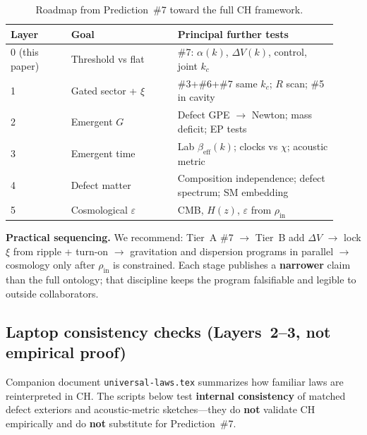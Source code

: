\documentclass[11pt,a4paper]{article}
\begin{document}
\begin{table}[htbp]
  \centering
  \small
  \caption{Roadmap from Prediction~\#7 toward the full CH framework.}
  \label{tab:roadmap}
  \begin{tabular}{@{}p{0.17\linewidth}p{0.30\linewidth}p{0.45\linewidth}@{}}
    \toprule
    Layer & Goal & Principal further tests \\
    \midrule
    0 (this paper) &
    Threshold vs flat &
    \#7: $\alpha(k)$, $\Delta V(k)$, control, joint $k_c$ \\
    1 &
    Gated sector + $\xi$ &
    \#3+\#6+\#7 same $k_c$; $R$ scan; \#5 in cavity \\
    2 &
    Emergent $G$ &
    Defect GPE $\to$ Newton; mass deficit; EP tests \\
    3 &
    Emergent time &
    Lab $\beta_{\mathrm{eff}}(k)$; clocks vs $\chi$; acoustic metric \\
    4 &
    Defect matter &
    Composition independence; defect spectrum; SM embedding \\
    5 &
    Cosmological $\varepsilon$ &
    CMB, $H(z)$, $\varepsilon$ from $\rho_{\mathrm{in}}$ \\
    \bottomrule
  \end{tabular}
\end{table}

\textbf{Practical sequencing.}
We recommend: Tier~A \#7 $\to$ Tier~B add $\Delta V$ $\to$ lock $\xi$ from ripple + turn-on $\to$ gravitation and dispersion programs in parallel $\to$ cosmology only after $\rho_{\mathrm{in}}$ is constrained.
Each stage publishes a \textbf{narrower} claim than the full ontology; that discipline keeps the program falsifiable and legible to outside collaborators.

\subsection{Laptop consistency checks (Layers~2--3, not empirical proof)}
\label{sec:numerics-consistency}

Companion document \texttt{universal-laws.tex} summarizes how familiar laws are reinterpreted in CH.
The scripts below test \textbf{internal consistency} of matched defect exteriors and acoustic-metric sketches---they do \textbf{not} validate CH empirically and do \textbf{not} substitute for Prediction~\#7.
\end{document}
